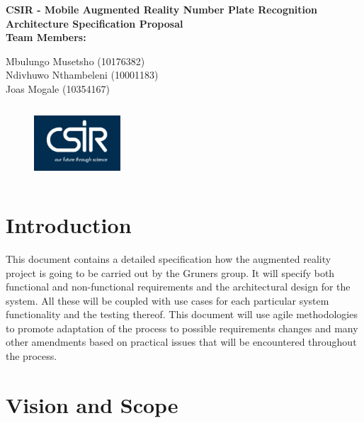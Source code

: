 \documentclass[12pt]{article}
\newcommand{\Title}{CSIR - Mobile Augmented Reality Number Plate Recognition} %
\begin{document}
        \vspace{4em}
        
        \begin{center}%
        
          \LARGE \bf \Title \\[4em]
          \LARGE {\bf Architecture Specification Proposal}\\[1em]
          \LARGE {\bf Team Members:}\\[2em]
          \large
          
             Mbulungo Musetsho                          (10176382)  \\[1em]
             Ndivhuwo Nthambeleni 						(10001183)	\\[1em]
             Joas Mogale 								(10354167)	\\[1em]
            
        \end{center}%
        \begin{figure}[h]
	           \centering
	           \includegraphics[width=1.27in, height=1.09in]{Pictures/csir.png}
	   	\end{figure}
	    \FloatBarrier
        

        \newpage
        \tableofcontents    
                \newpage
                \section{Introduction}
                		This document contains a detailed specification how the augmented reality project is going to be carried out by the Gruners group. It will specify both functional and non-functional requirements and the architectural design for the system. All these will be coupled with use cases for each particular system functionality and the testing thereof. This document will use agile methodologies to promote adaptation of the process to possible requirements changes and many other amendments based on practical issues that will be encountered throughout the process. 
                \section{Vision and Scope}
\end{document}
